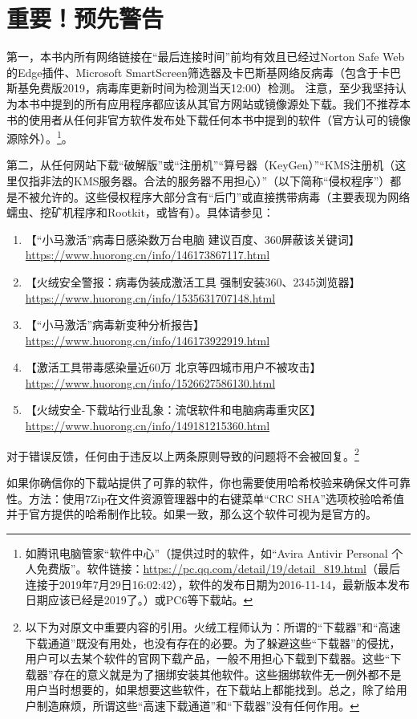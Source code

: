 \section{重要！预先警告}
第一，本书内所有网络链接在“最后连接时间”前均有效且已经过Norton Safe Web的Edge插件、Microsoft SmartScreen筛选器及卡巴斯基网络反病毒（包含于卡巴斯基免费版2019，病毒库更新时间为检测当天12:00）检测。 {\color{red}注意，至少我坚持认为本书中提到的所有应用程序都应该从其官方网站或镜像源处下载。我们不推荐本书的使用者从任何非官方软件发布处下载任何本书中提到的软件（官方认可的镜像源除外）。}\footnote{如腾讯电脑管家“软件中心”（提供过时的软件，如“Avira Antivir Personal 个人免费版”。软件链接：\url{https://pc.qq.com/detail/19/detail\_819.html}（最后连接于2019年7月29日16:02:42），软件的发布日期为2016-11-14，最新版本发布日期应该已经是2019了。）或PC6等下载站。}。\par 
第二，从任何网站下载“破解版”或“注册机”“算号器（KeyGen）”“KMS注册机（这里仅指非法的KMS服务器。合法的服务器不用担心）”（以下简称“侵权程序”）都是不被允许的。这些侵权程序大部分含有“后门”或直接携带病毒（主要表现为网络蠕虫、挖矿机程序和Rootkit，或皆有）。具体请参见：
\begin{enumerate}
	\item 【“小马激活”病毒日感染数万台电脑 建议百度、360屏蔽该关键词】\url{https://www.huorong.cn/info/146173867117.html}
	\item 【火绒安全警报：病毒伪装成激活工具  强制安装360、2345浏览器】\url{https://www.huorong.cn/info/1535631707148.html}
	\item 【“小马激活”病毒新变种分析报告】\url{https://www.huorong.cn/info/146173922919.html}
	\item 【激活工具带毒感染量近60万 北京等四城市用户不被攻击】\url{https://www.huorong.cn/info/1526627586130.html}
	\item 【火绒安全-下载站行业乱象：流氓软件和电脑病毒重灾区】\url{https://www.huorong.cn/info/149181215360.html}
\end{enumerate}\par
对于错误反馈，任何由于违反以上两条原则导致的问题将不会被回复。\footnote{以下为对原文中重要内容的引用。火绒工程师认为：所谓的“下载器”和“高速下载通道”既没有用处，也没有存在的必要。为了躲避这些“下载器”的侵扰，用户可以去某个软件的官网下载产品，一般不用担心下载到下载器。这些“下载器”存在的意义就是为了捆绑安装其他软件。这些捆绑软件无一例外都不是用户当时想要的，如果想要这些软件，在下载站上都能找到。总之，除了给用户制造麻烦，所谓这些“高速下载通道”和“下载器”没有任何作用。}\par 
如果你确信你的下载站提供了可靠的软件，你也需要使用哈希校验来确保文件可靠性。方法：使用7Zip在文件资源管理器中的右键菜单“CRC SHA”选项校验哈希值并于官方提供的哈希制作比较。如果一致，那么这个软件可视为是官方的。 \par
